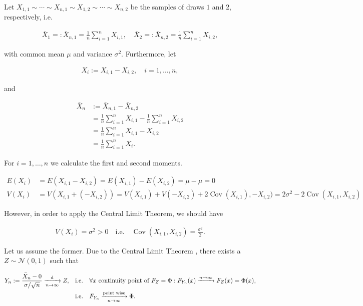 \begin{solution}

Let $X_{1, 1} \sim \cdots \sim X_{n, 1} \sim X_{1, 2} \sim \cdots \sim X_{n, 2}$ be the samples of draws $1$ and $2$, respectively, i.e.

\begin{align*}
    \bar X_1 =: \bar X_{n, 1} = \frac{1}{n} \sum_{i=1}^n X_{i, 1},
    \quad
    \bar X_2 =: \bar X_{n, 2} = \frac{1}{n} \sum_{i=1}^n X_{i, 2},
\end{align*}

with common mean $\mu$ and variance $\sigma^2$.
Furthermore, let

\begin{align*}
    X_i := X_{i, 1} - X_{i, 2},
    \quad
    i = 1, \dots, n,
\end{align*}

and

\begin{align*}
    \bar X_n
    & :=
    \bar X_{n, 1} - \bar X_{n, 2} \\
    & =
    \frac{1}{n} \sum_{i=1}^n X_{i, 1}
    -
    \frac{1}{n} \sum_{i=1}^n X_{i, 2} \\
    & =
    \frac{1}{n} \sum_{i=1}^n X_{i, 1} - X_{i, 2} \\
    & =
    \frac{1}{n} \sum_{i=1}^n X_i.
\end{align*}

For $i = 1, \dots, n$ we calculate the first and second moments.

\begin{align*}
    E(X_i) & = E(X_{i, 1} - X_{i, 2}) = E(X_{i, 1}) - E(X_{i, 2}) = \mu - \mu = 0 \\
    V(X_i) & = V(X_{i, 1} + (-X_{i, 2})) = V(X_{i, 1}) + V(-X_{i, 2}) + 2 \operatorname{Cov}(X_{i, 1}), -X_{i, 2}) = 2 \sigma^2 - 2 \operatorname{Cov}(X_{i, 1}, X_{i, 2})
\end{align*}

However, in order to apply the Central Limit Theorem, we should have

\begin{align*}
    V(X_i) = \sigma^2 > 0
    \quad
    \text{i.e.}
    \quad
    \operatorname{Cov}(X_{i, 1}, X_{i, 2}) = \frac{\sigma^2}{2}.
\end{align*}

Let us assume the former.
Due to the Central Limit Theorem \cite[Lecture 4, Slide 61]{EStat}, there exists a $Z \sim \mathcal N(0, 1)$ such that

\begin{align*}
    Y_n
    :=
    \frac{\bar X_n - 0}{\sigma / \sqrt n}
    \xrightarrow[n \to \infty]{\text d}
    Z,
    \quad
    & \text{i.e.}
    \quad
    \forall x ~\text{continuity point of $F_Z = \Phi$}:
        F_{Y_n}(x) \xrightarrow{n \to \infty} F_Z(x) = \Phi(x), \\
    & \text{i.e.}
    \quad
    F_{Y_n} \xrightarrow[n \to \infty]{\text{point wise}} \Phi.
\end{align*}


\end{solution}
